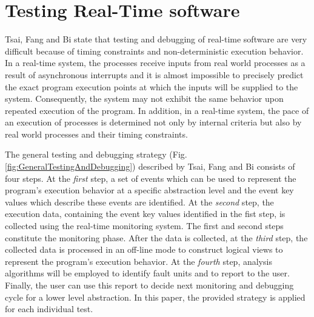 
\section{Testing Real-Time software}
Tsai, Fang and Bi\cite{rtSandD} state that testing and debugging of real-time software are very difficult because of timing constraints and non-deterministic execution behavior. In a real-time system, the processes receive inputs from real world processes as a result of asynchronous interrupts and it is almost impossible to precisely predict the exact program execution points at which the inputs will be supplied to the system. Consequently, the system may not exhibit the same behavior upon repeated execution of the program. In addition, in a real-time system, the pace of an execution of processes is determined not only by internal criteria but also by real world processes and their timing constraints. 

The general testing and debugging strategy (Fig. \ref{fig:GeneralTestingAndDebugging}) described by Tsai, Fang and Bi \cite{rtSandD} consists of four steps.
At the \textit{first} step, a set of events which can be used to represent the program's execution behavior at a specific abstraction level and the event key values which describe these events are identified. 
At the \textit{second} step, the execution data, containing the event key values identified in the fist step, is collected using the real-time monitoring system. 
The first and second steps constitute the monitoring phase. After the data is collected, at the \textit{third} step, the collected data is processed in an off-line mode to construct logical views to represent the program's execution behavior.
At the \textit{fourth} step, analysis algorithms will be employed to identify fault units and to report to the user. 
Finally, the user can use this report to decide next monitoring and debugging cycle for a lower level abstraction.
In this paper, the provided strategy is applied for each individual test.


